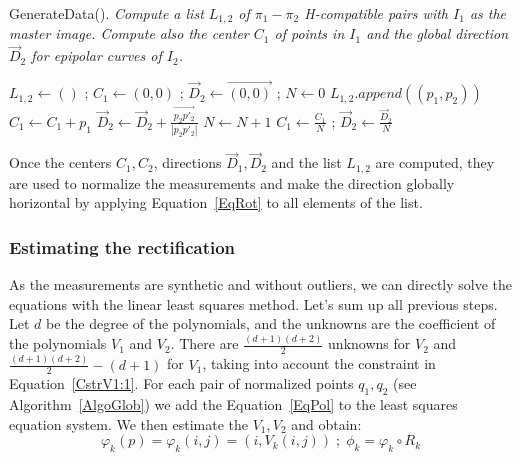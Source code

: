 \documentclass{ipol}
\newcommand{\PiVert}{\widetilde{\pi}}
\newcommand{\er}[1]{\textcolor{orange}{#1}}
\begin{document}
\begin{algorithm}[H]
\caption{GenerateData(). \emph{Compute a list $L_{1,2}$  of   $\pi_1-\pi_2$ H-compatible pairs with $I_1$ as the master image.
 Compute also the center $C_1$ of points in $I_1$  and the global direction $\vec{D}_2$ for epipolar curves of $I_2$.}}
\begin{algorithmic}
    \STATE $L_{1,2}\gets () $ ;  $C_1 \gets (0,0)$  ;   $\vec{D}_2 \gets  \overrightarrow{(0,0)}$ ; $N \gets 0 $
                  \STATE {$p_2 = \pi_2(\PiVert^{-1}_1(p_1,Z))$}
                  \STATE {$p'_2 = \pi_2(\PiVert^{-1}_1(p_1,Z+\delta_{z}))$}
                       \STATE $L_{1,2}.append((p_1,p_2))$  
                       \STATE $C_1 \gets C_1 + p_1$
                       \STATE $\vec{D}_2 \gets  \vec{D}_2 + \frac{\overrightarrow{p_2 p'_2}}{|p_2 p'_2|}$
                       \STATE $N \gets  N +1 $
                  \ENDIF
             \ENDFOR
        \ENDFOR
    \ENDFOR
    $C_1 \gets \frac{C_1}{N}$  ; $\vec{D}_2 \gets \frac{\vec{D}_2}{N} $
\end{algorithmic}
\label{AlgoGenData}
\end{algorithm}



Once the centers $C_1,C_2$, directions   $\vec{D}_1,\vec{D}_2$  and the list $L_{1,2}$ are computed,
they are used to normalize the measurements and make the direction globally
horizontal by applying Equation~\eqref{EqRot} to all elements of the list.


\subsubsection{Estimating the rectification}

As the measurements are synthetic and without outliers, we can directly solve
the equations with the linear least squares  method. Let's sum up all previous steps. Let $d$ be the degree of the polynomials, and the unknowns are the coefficient of the polynomials $V_1$ and $V_2$. There are
          $\frac{(d+1)(d+2)}{2}$ unknowns for $V_2$ and $\frac{(d+1)(d+2)}{2}-(d+1) $  for $V_1$,
          taking into account the  constraint in Equation~\eqref{CstrV1:1}. For each pair of normalized points $q_1,q_2$ (see Algorithm~\ref{AlgoGlob}) we add 
          the Equation~\eqref{EqPol} to the least squares equation system. We then estimate the $V_1,V_2$ and obtain:
%
\begin{equation}
  \varphi_k(p) = \varphi_k(i,j) = (i,V_k(i,j))  \;;\;    \phi_k =  \varphi_k  \circ R_k 
\end{equation} 
%
\end{document}
